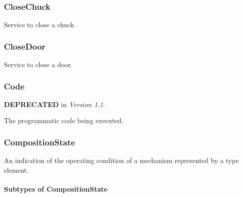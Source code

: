 \subsubsection{CloseChuck}
\label{sec:CloseChuck}



Service to close a chuck.



\subsubsection{CloseDoor}
\label{sec:CloseDoor}



Service to close a door.



\subsubsection{Code}
\label{sec:Code}



\textbf{DEPRECATED} in \textit{Version 1.1}.

The programmatic code being executed.



\subsubsection{CompositionState}
\label{sec:CompositionState}



An indication of the operating condition of a mechanism represented by a  type element.


\paragraph{Subtypes of CompositionState}\mbox{}
\label{sec:Subtypes of CompositionState}


